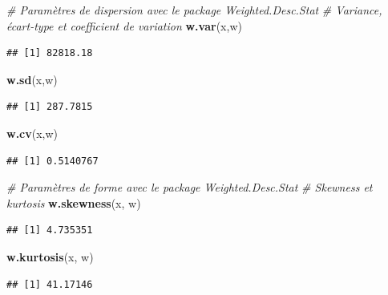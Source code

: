 \documentclass[
  11pt,
  french,
]{book}
\makeatletter
\newenvironment{Shaded}{\begin{snugshade}}{\end{snugshade}}
\newcommand{\CommentTok}[1]{\textcolor[rgb]{0.56,0.35,0.01}{\textit{#1}}}
\newcommand{\KeywordTok}[1]{\textcolor[rgb]{0.13,0.29,0.53}{\textbf{#1}}}
\newcommand{\NormalTok}[1]{#1}
\newenvironment{kframe}{%
\medskip{}
\setlength{\fboxsep}{.8em}
 \def\at@end@of@kframe{}%
 \ifinner\ifhmode%
  \def\at@end@of@kframe{\end{minipage}}%
  \begin{minipage}{\columnwidth}%
 \fi\fi%
 \def\FrameCommand##1{\hskip\@totalleftmargin \hskip-\fboxsep
 \colorbox{shadecolor}{##1}\hskip-\fboxsep
     \hskip-\linewidth \hskip-\@totalleftmargin \hskip\columnwidth}%
 \MakeFramed {\advance\hsize-\width
   \@totalleftmargin\z@ \linewidth\hsize
   \@setminipage}}%
 {\par\unskip\endMakeFramed%
 \at@end@of@kframe}
\renewenvironment{Shaded}{\begin{kframe}}{\end{kframe}}
\makeatother
\begin{document}
\begin{Shaded}
\begin{Highlighting}[]
\CommentTok{# Paramètres de dispersion avec le package Weighted.Desc.Stat}
\CommentTok{# Variance, écart-type et coefficient de variation}
\KeywordTok{w.var}\NormalTok{(x,w)}
\end{Highlighting}
\end{Shaded}

\begin{verbatim}
## [1] 82818.18
\end{verbatim}

\begin{Shaded}
\begin{Highlighting}[]
\KeywordTok{w.sd}\NormalTok{(x,w)}
\end{Highlighting}
\end{Shaded}

\begin{verbatim}
## [1] 287.7815
\end{verbatim}

\begin{Shaded}
\begin{Highlighting}[]
\KeywordTok{w.cv}\NormalTok{(x,w)}
\end{Highlighting}
\end{Shaded}

\begin{verbatim}
## [1] 0.5140767
\end{verbatim}

\begin{Shaded}
\begin{Highlighting}[]
\CommentTok{# Paramètres de forme avec le package Weighted.Desc.Stat}
\CommentTok{# Skewness et kurtosis }
\KeywordTok{w.skewness}\NormalTok{(x, w)}
\end{Highlighting}
\end{Shaded}

\begin{verbatim}
## [1] 4.735351
\end{verbatim}

\begin{Shaded}
\begin{Highlighting}[]
\KeywordTok{w.kurtosis}\NormalTok{(x, w)}
\end{Highlighting}
\end{Shaded}

\begin{verbatim}
## [1] 41.17146
\end{verbatim}

  

\printindex
\end{document}
